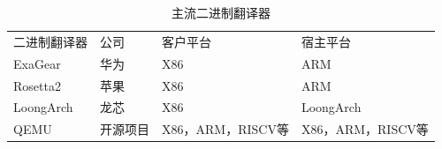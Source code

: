 \begin{table}[]
\centering
\caption{主流二进制翻译器}
\label{tab:BTs}
  \begin{tabular}{llll}
  \rowcolor[HTML]{FBE5D6} 
  二进制翻译器    & 公司   & 客户平台           & 宿主平台           \\
  ExaGear   & 华为   & X86            & ARM            \\
  Rosetta2  & 苹果   & X86            & ARM            \\
  LoongArch & 龙芯   & X86            & LoongArch      \\
  QEMU      & 开源项目 & X86，ARM，RISCV等 & X86，ARM，RISCV等
  \end{tabular}
  \end{table}



  
  
  
